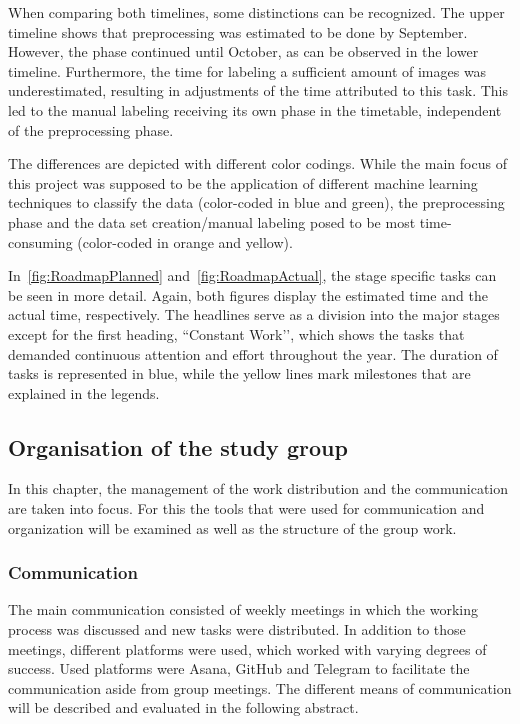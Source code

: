 When comparing both timelines, some distinctions can be recognized. The upper timeline shows that preprocessing was estimated to be done by September. However, the phase continued until October, as can be observed in the lower timeline. Furthermore, the time for labeling a sufficient amount of images was underestimated, resulting in adjustments of the time attributed to this task. This led to the manual labeling receiving its own phase in the timetable, independent of the preprocessing phase.

The differences are depicted with different color codings. While the main focus of this project was supposed to be the application of different machine learning techniques to classify the data (color-coded in blue and green), the preprocessing phase and the data set creation/manual labeling posed to be most time-consuming (color-coded in orange and yellow).

In~\autoref{fig:RoadmapPlanned} and~\autoref{fig:RoadmapActual}, the stage specific tasks can be seen in more detail. Again, both figures display the estimated time and the actual time, respectively. The headlines serve as a division into the major stages except for the first heading, ``Constant Work’’, which shows the tasks that demanded continuous attention and effort throughout the year. The duration of tasks is represented in blue, while the yellow lines mark milestones that are explained in the legends.

\subsection{Organisation of the study group}
\label{sec:Organization}

In this chapter, the management of the work distribution and the communication are taken into focus. For this the tools that were used for communication and organization will be examined as well as the structure of the group work.


\subsubsection{Communication}
\label{subsec:Communication}

The main communication consisted of weekly meetings in which the working process was discussed and new tasks were distributed. In addition to those meetings, different platforms were used, which worked with varying degrees of success. Used platforms were Asana, GitHub and Telegram to facilitate the communication aside from group meetings. The different means of communication will be described and evaluated in the following abstract.

